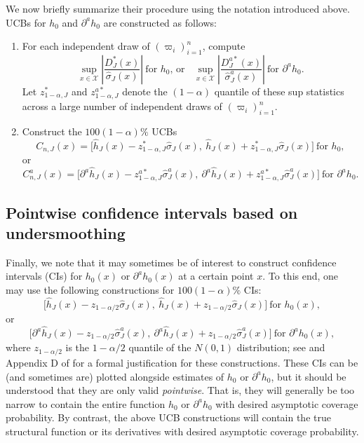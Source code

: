 \documentclass[
]{jss}
\begin{document}
We now briefly summarize their procedure using the notation introduced
above. UCBs for \(h_0\) and \(\partial^a h_0\) are constructed as
follows:

\begin{enumerate}
\item For each independent draw of $(\varpi_i)_{i=1}^n$, compute
\begin{equation} \label{eq:z_star-J-UCB}
 \sup_{x\in \mathcal{X}} \left| \frac{D_J^*(x)}{\hat \sigma_J(x)} \right|~\mbox{for $h_0$, or}~~~~\sup_{x \in \mathcal{X}} \left| \frac{D_J^{a*}(x)}{\hat \sigma_J^a(x)} \right|~\mbox{for $\partial^a h_0$}.
\end{equation}
Let $z_{1-\alpha,J}^*$ and $z_{1-\alpha,J}^{a*}$ denote the $(1-\alpha )$ quantile of
these sup statistics across a large number of independent draws of $(\varpi_i)_{i=1}^n$.
\item Construct the $100(1-\alpha)\%$ UCBs
\[
 C_{n,J}(x) = \bigg[ \hat{h}_{J}(x) -  z_{1-\alpha,J}^* \hat \sigma_{J}(x) , ~  \hat{h}_{J}(x) + z_{1-\alpha,J}^* \hat \sigma_{J}(x) \bigg] ~\mbox{for $h_0$},
\]
or
\[
 C_{n,J}^a(x) = \bigg[ \partial^a \hat{h}_{J}(x) - z_{1-\alpha,J}^{a*} \hat \sigma_{J}^a(x) ,~ \partial^a \hat{h}_{J}(x) +  z_{1-\alpha,J}^{a*} \hat \sigma_{J}^a(x) \bigg] ~\mbox{for $\partial^a h_0$}.
\]
\end{enumerate}

\hypertarget{pw}{%
\subsection{Pointwise confidence intervals based on
undersmoothing}\label{pw}}

Finally, we note that it may sometimes be of interest to construct
confidence intervals (CIs) for \(h_0(x)\) or \(\partial^a h_0(x)\) at a
certain point \(x\). To this end, one may use the following
constructions for \(100(1-\alpha)\%\) CIs: \[
 \bigg[ \hat{h}_{J}(x) -  z_{1-\alpha/2} \hat \sigma_{J}(x) , ~  \hat{h}_{J}(x) + z_{1-\alpha/2} \hat \sigma_{J}(x) \bigg] ~\mbox{for $h_0(x)$},
\] or \[
 \bigg[ \partial^a \hat{h}_{J}(x) - z_{1-\alpha/2} \hat \sigma_{J}^a(x) ,~ \partial^a \hat{h}_{J}(x) +  z_{1-\alpha/2} \hat \sigma_{J}^a(x) \bigg] ~\mbox{for $\partial^a h_0(x)$},
\] where \(z_{1-\alpha/2}\) is the \(1-\alpha/2\) quantile of the
\(N(0,1)\) distribution; see \citet{ChenPouzo} and Appendix D of
\citet{CCQE} for a formal justification for these constructions. These
CIs can be (and sometimes are) plotted alongside estimates of \(h_0\) or
\(\partial^a h_0\), but it should be understood that they are only valid
\emph{pointwise}. That is, they will generally be too narrow to contain
the entire function \(h_0\) or \(\partial^a h_0\) with desired
asymptotic coverage probability. By contrast, the above UCB
constructions will contain the true structural function or its
derivatives with desired asymptotic coverage probability.
\end{document}
